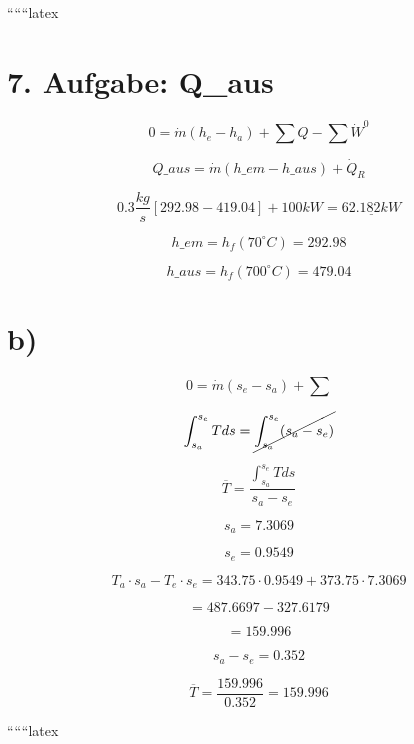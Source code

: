 
``````latex


\section*{7. Aufgabe: Q\_aus}

\[
0 = \dot{m} \left( h_e - h_a \right) + \sum Q - \sum \dot{W}^0
\]

\[
Q\_aus = \dot{m} \left( h\_em - h\_aus \right) + \dot{Q}_R
\]

\[
0.3 \frac{kg}{s} \left[ 292.98 - 419.04 \right] + 100 kW = \underline{62.182 kW}
\]

\[
h\_em = h_f(70^\circ C) = 292.98
\]

\[
h\_aus = h_f(700^\circ C) = 479.04
\]

\section*{b)}

\[
0 = \dot{m} (s_e - s_a) + \sum
\]

\[
\int_{s_a}^{s_e} T ds = \cancel{\int_{s_a}^{s_e} (s_a - s_e)}
\]

\[
\overline{T} = \frac{\int_{s_a}^{s_e} T ds}{s_a - s_e}
\]

\[
s_a = 7.3069
\]

\[
s_e = 0.9549
\]

\[
T_a \cdot s_a - T_e \cdot s_e = 343.75 \cdot 0.9549 + 373.75 \cdot 7.3069
\]

\[
= 487.6697 - 327.6179
\]

\[
= 159.996
\]

\[
s_a - s_e = 0.352
\]

\[
\overline{T} = \frac{159.996}{0.352} = 159.996
\]

``````latex


